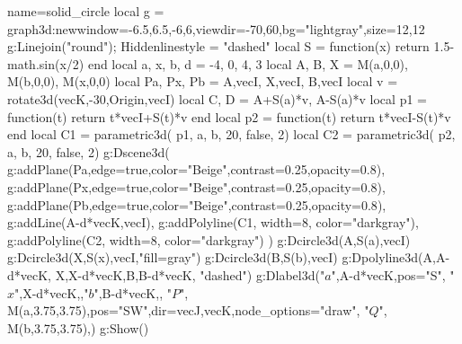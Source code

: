 \documentclass[12pt]{standalone}
\begin{document}
\begin{luadraw}{name=solid_circle}
local g = graph3d:new{window={-6.5,6.5,-6,6},viewdir={-70,60},bg="lightgray",size={12,12}}
g:Linejoin("round"); Hiddenlinestyle = "dashed"
local S = function(x) return 1.5-math.sin(x/2) end
local a, x, b, d = -4, 0, 4, 3
local A, B, X = M(a,0,0), M(b,0,0), M(x,0,0)
local Pa, Px, Pb = {A,vecI}, {X,vecI}, {B,vecI}
local v = rotate3d(vecK,-30,{Origin,vecI})
local C, D = A+S(a)*v, A-S(a)*v
local p1 = function(t) return t*vecI+S(t)*v end
local p2 = function(t) return t*vecI-S(t)*v end
local C1 = parametric3d( p1, a, b, 20, false, 2)
local C2 = parametric3d( p2, a, b, 20, false, 2)
g:Dscene3d(
    g:addPlane(Pa,{edge=true,color="Beige",contrast=0.25,opacity=0.8}),
    g:addPlane(Px,{edge=true,color="Beige",contrast=0.25,opacity=0.8}),
    g:addPlane(Pb,{edge=true,color="Beige",contrast=0.25,opacity=0.8}),
    g:addLine({A-d*vecK,vecI}),
    g:addPolyline(C1, {width=8, color="darkgray"}),
    g:addPolyline(C2, {width=8, color="darkgray"})
)
g:Dcircle3d(A,S(a),vecI)
g:Dcircle3d(X,S(x),vecI,"fill=gray")
g:Dcircle3d(B,S(b),vecI)
g:Dpolyline3d({{A,A-d*vecK}, {X,X-d*vecK},{B,B-d*vecK}}, "dashed")
g:Dlabel3d("$a$",A-d*vecK,{pos="S"}, "$x$",X-d*vecK,{},"$b$",B-d*vecK,{},
    "$P$", M(a,3.75,3.75),{pos="SW",dir={vecJ,vecK},node_options="draw"},
    "$Q$", M(b,3.75,3.75),{})
g:Show()
\end{luadraw}
\end{document}
